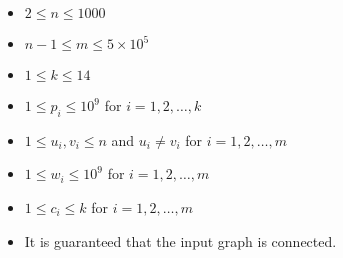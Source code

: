 \begin{itemize}
\tightlist
\item $2 \leq n \leq 1000$
\item $n-1 \leq m \leq 5 \times 10 ^ 5$
\item $1 \leq k \leq 14$
\item $1 \leq p_i \leq 10 ^ 9$ for $i = 1, 2, \ldots, k$
\item $1 \leq u_i, v_i \leq n$ and $u_i \neq v_i$ for $i = 1, 2, \ldots, m$
\item $1 \leq w_i \leq 10^9$ for $i = 1, 2, \ldots, m$
\item $1 \leq c_i \leq k$ for $i = 1, 2, \ldots, m$
\item It is guaranteed that the input graph is connected.
\end{itemize}
